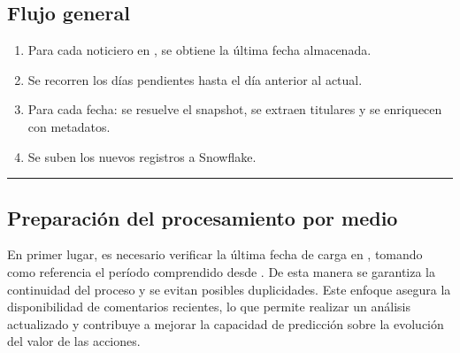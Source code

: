 \documentclass[letterpaper,10pt,spanish]{sphinxmanual}
\begin{document}
\subsection{Flujo general}
\label{\detokenize{DatosPreparacion:flujo-general}}\begin{enumerate}
%
\item {} 
\sphinxAtStartPar
Para cada noticiero en , se obtiene la última fecha almacenada.

\item {} 
\sphinxAtStartPar
Se recorren los días pendientes hasta el día anterior al actual.

\item {} 
\sphinxAtStartPar
Para cada fecha: se resuelve el snapshot, se extraen titulares y se enriquecen con metadatos.

\item {} 
\sphinxAtStartPar
Se suben los nuevos registros a Snowflake.

\end{enumerate}


\bigskip\hrule\bigskip



\subsection{Preparación del procesamiento por medio}
\label{\detokenize{DatosPreparacion:preparacion-del-procesamiento-por-medio}}
\sphinxAtStartPar
En primer lugar, es necesario verificar la última fecha de carga en , tomando como referencia el período comprendido desde . De esta manera se garantiza la continuidad del proceso y se evitan posibles duplicidades. Este enfoque asegura la disponibilidad de comentarios recientes, lo que permite realizar un análisis actualizado y contribuye a mejorar la capacidad de predicción sobre la evolución del valor de las acciones.
\end{document}
